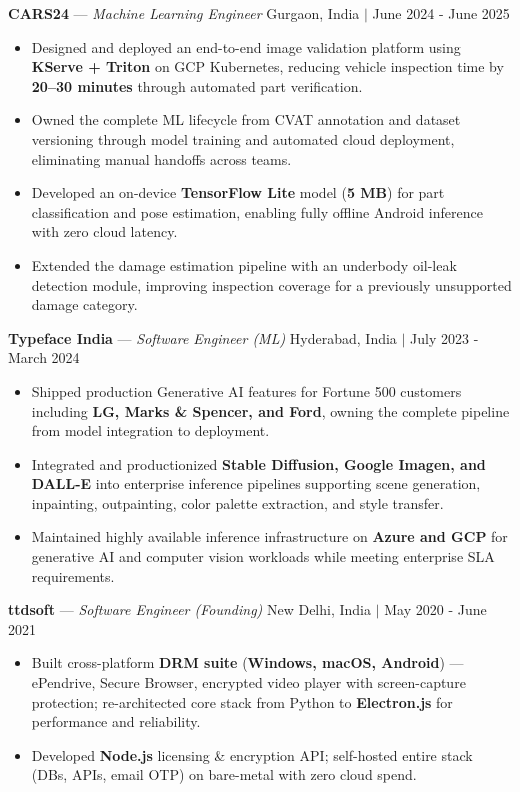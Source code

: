\documentclass[a4paper,7.5pt]{extarticle}
\begin{document}
\noindent
\textbf{CARS24} --- \textit{Machine Learning Engineer} \hfill Gurgaon, India $|$ June 2024 - June 2025
\begin{itemize}
    \item Designed and deployed an end-to-end image validation platform using \textbf{KServe + Triton} on GCP Kubernetes, reducing vehicle inspection time by \textbf{20--30 minutes} through automated part verification.
    \item Owned the complete ML lifecycle from CVAT annotation and dataset versioning through model training and automated cloud deployment, eliminating manual handoffs across teams.
    \item Developed an on-device \textbf{TensorFlow Lite} model (\textbf{5 MB}) for part classification and pose estimation, enabling fully offline Android inference with zero cloud latency.
    \item Extended the damage estimation pipeline with an underbody oil-leak detection module, improving inspection coverage for a previously unsupported damage category.
\end{itemize}



\vspace{0pt}
\noindent
\textbf{Typeface India} --- \textit{Software Engineer (ML)} \hfill Hyderabad, India $|$ July 2023 - March 2024
\begin{itemize}
    \item Shipped production Generative AI features for Fortune 500 customers including \textbf{LG, Marks \& Spencer, and Ford}, owning the complete pipeline from model integration to deployment.
    \item Integrated and productionized \textbf{Stable Diffusion, Google Imagen, and DALL-E} into enterprise inference pipelines supporting scene generation, inpainting, outpainting, color palette extraction, and style transfer.
    \item Maintained highly available inference infrastructure on \textbf{Azure and GCP} for generative AI and computer vision workloads while meeting enterprise SLA requirements.
\end{itemize}

\vspace{0pt}
\noindent
\textbf{ttdsoft} --- \textit{Software Engineer (Founding)} \hfill New Delhi, India $|$ May 2020 - June 2021
\begin{itemize}
    \item Built cross-platform \textbf{DRM suite} (\textbf{Windows, macOS, Android}) --- ePendrive, Secure Browser, encrypted video player with screen-capture protection; re-architected core stack from Python to \textbf{Electron.js} for performance and reliability.
    \item Developed \textbf{Node.js} licensing \& encryption API; self-hosted entire stack (DBs, APIs, email OTP) on bare-metal with zero cloud spend.
\end{itemize}
\end{document}
